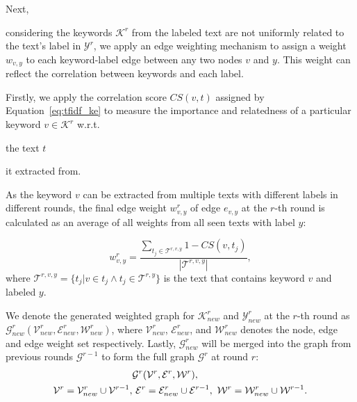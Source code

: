 Next, 

considering the keywords $\mathcal{K}^r$ from the labeled text are not uniformly related to the text's label in $\mathcal{Y}^r$, 
we apply an edge weighting mechanism to assign a weight $w_{v,y}$ to each keyword-label edge between any two nodes $v$ and $y$.
This weight can reflect the correlation between keywords and each label.

Firstly, 
we apply the correlation score $CS(v,t)$ assigned by Equation~\eqref{eq:tfidf_ke} to measure the importance and relatedness of a particular keyword $v \in \mathcal{K}^r$ w.r.t. 

the text $t$ 

it extracted from.





As the keyword $v$ can be extracted from multiple texts with different labels in different rounds, the final edge weight $w_{v,y}^r$ of edge $e_{v,y}$ 
at the $r$-th round is calculated as an average of all weights from all seen texts with label $y$:

\vspace{-5px}
\begin{equation}\label{eq:edge_weigting}
	
	w_{v,y}^r=\frac{\sum_{t_j \in \mathcal{T}^{r,v,y} }1-CS(v,t_j)}{
|\mathcal{T}^{r,v,y} |
	}, 
\end{equation}
where $\mathcal{T}^{r,v,y}  = \{t_j|   v\in t_j \land t_j \in \mathcal{T}^{r,y}\}$ is the text that contains keyword $v$ and labeled $y$. 

We denote the generated weighted graph for $\mathcal{K}_{new}^r$ and $\mathcal{Y}_{new}^r$ at the $r$-th round as $\mathcal{G}^r_{new}(\mathcal{V}_{new}^r,\mathcal{E}_{new}^r, \mathcal{W}_{new}^r)$, 
where $\mathcal{V}^r_{new}$, $\mathcal{E}^r_{new}$, and $\mathcal{W}^r_{new}$ denotes the node, edge and edge weight set respectively.
Lastly, $\mathcal{G}^r_{new}$ will be merged into the graph from previous rounds $\mathcal{G}^{r-1}$ to form the full graph $\mathcal{G}^r$ at round $r$: 
\begin{align}
	&\mathcal{G}^r(\mathcal{V}^r,\mathcal{E}^r,\mathcal{W}^r),\\ \mathcal{V}^{r}=\mathcal{V}^{r}_{new}\cup \mathcal{V}^{r-1}, &\ \mathcal{E}^{r}=\mathcal{E}^{r}_{new}\cup \mathcal{E}^{r-1},\  \mathcal{W}^{r}=\mathcal{W}^{r}_{new}\cup \mathcal{W}^{r-1}.\notag 
\end{align}







